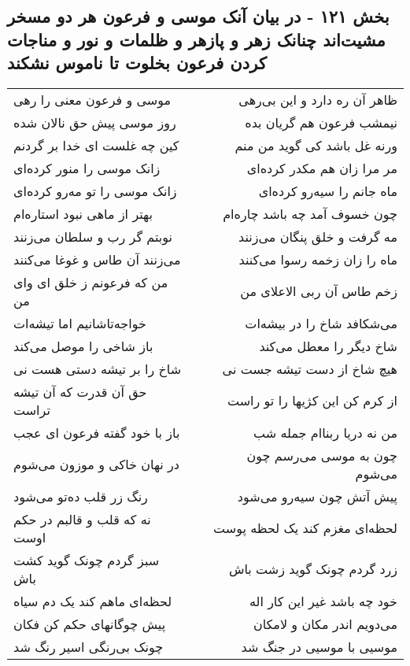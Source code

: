\begin{center}
\section*{بخش ۱۲۱ - در بیان آنک موسی و فرعون هر دو مسخر مشیت‌اند چنانک زهر و پازهر و ظلمات و نور و مناجات کردن فرعون بخلوت تا ناموس نشکند}
\label{sec:sh121}
\begin{longtable}{l p{0.5cm} r}
موسی و فرعون معنی را رهی
&&
ظاهر آن ره دارد و این بی‌رهی
\\
روز موسی پیش حق نالان شده
&&
نیمشب فرعون هم گریان بده
\\
کین چه غلست ای خدا بر گردنم
&&
ورنه غل باشد کی گوید من منم
\\
زانک موسی را منور کرده‌ای
&&
مر مرا زان هم مکدر کرده‌ای
\\
زانک موسی را تو مه‌رو کرده‌ای
&&
ماه جانم را سیه‌رو کرده‌ای
\\
بهتر از ماهی نبود استاره‌ام
&&
چون خسوف آمد چه باشد چاره‌ام
\\
نوبتم گر رب و سلطان می‌زنند
&&
مه گرفت و خلق پنگان می‌زنند
\\
می‌زنند آن طاس و غوغا می‌کنند
&&
ماه را زان زخمه رسوا می‌کنند
\\
من که فرعونم ز خلق ای وای من
&&
زخم طاس آن ربی الاعلای من
\\
خواجه‌تاشانیم اما تیشه‌ات
&&
می‌شکافد شاخ را در بیشه‌ات
\\
باز شاخی را موصل می‌کند
&&
شاخ دیگر را معطل می‌کند
\\
شاخ را بر تیشه دستی هست نی
&&
هیچ شاخ از دست تیشه جست نی
\\
حق آن قدرت که آن تیشه تراست
&&
از کرم کن این کژیها را تو راست
\\
باز با خود گفته فرعون ای عجب
&&
من نه دریا ربناام جمله شب
\\
در نهان خاکی و موزون می‌شوم
&&
چون به موسی می‌رسم چون می‌شوم
\\
رنگ زر قلب ده‌تو می‌شود
&&
پیش آتش چون سیه‌رو می‌شود
\\
نه که قلب و قالبم در حکم اوست
&&
لحظه‌ای مغزم کند یک لحظه پوست
\\
سبز گردم چونک گوید کشت باش
&&
زرد گردم چونک گوید زشت باش
\\
لحظه‌ای ماهم کند یک دم سیاه
&&
خود چه باشد غیر این کار اله
\\
پیش چوگانهای حکم کن فکان
&&
می‌دویم اندر مکان و لامکان
\\
چونک بی‌رنگی اسیر رنگ شد
&&
موسیی با موسیی در جنگ شد
\\

\end{longtable}
\end{center}

